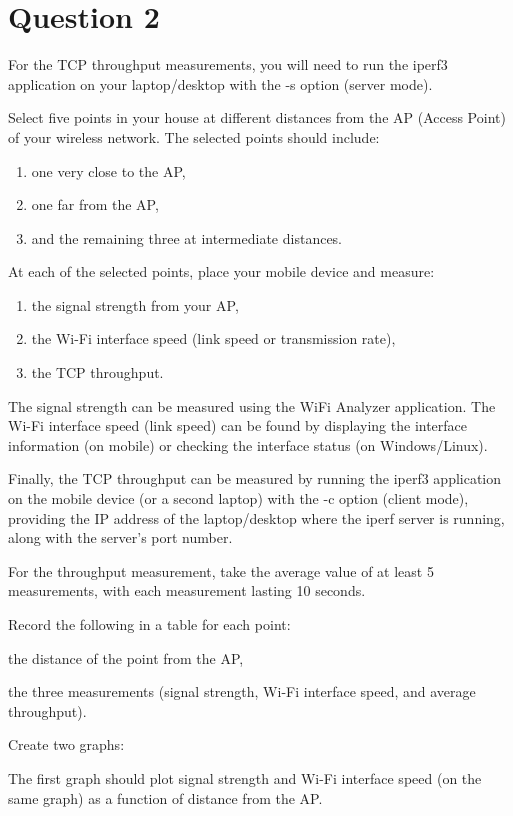 \documentclass{article}
\begin{document}
\section{Question 2}
For the TCP throughput measurements, you will need to run the iperf3 application on your laptop/desktop with the -s option (server mode).

Select five points in your house at different distances from the AP (Access Point) of your wireless network.
The selected points should include:

\begin{enumerate}
    \item one very close to the AP,
    \item one far from the AP,
    \item and the remaining three at intermediate distances.
\end{enumerate}

At each of the selected points, place your mobile device and measure:

\begin{enumerate}
    \item the signal strength from your AP,
    \item the Wi-Fi interface speed (link speed or transmission rate),
    \item the TCP throughput.
\end{enumerate}

The signal strength can be measured using the WiFi Analyzer application.
The Wi-Fi interface speed (link speed) can be found by displaying the interface information (on mobile) or checking the interface status (on Windows/Linux).

Finally, the TCP throughput can be measured by running the iperf3 application on the mobile device (or a second laptop) with the -c option (client mode), providing the IP address of the laptop/desktop where the iperf server is running, along with the server's port number.

For the throughput measurement, take the average value of at least 5 measurements, with each measurement lasting 10 seconds.

Record the following in a table for each point:

the distance of the point from the AP,

the three measurements (signal strength, Wi-Fi interface speed, and average throughput).

Create two graphs:

The first graph should plot signal strength and Wi-Fi interface speed (on the same graph) as a function of distance from the AP.
\end{document}
